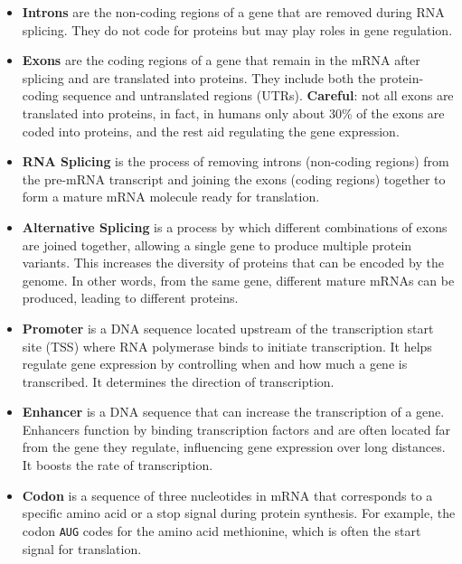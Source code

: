 \documentclass[a4paper]{article}
\begin{document}
\begin{itemize}
  \item \textbf{Introns} are the non-coding regions of a gene that are 
  removed during RNA splicing. They do not code for proteins but may play 
  roles in gene regulation.

  \item \textbf{Exons} are the coding regions of a gene that remain in the 
  mRNA after splicing and are translated into proteins. They include both
  the protein-coding sequence and untranslated regions (UTRs). \textbf{Careful}:
  not all exons are translated into proteins, in fact, in humans only about
  30\% of the exons are coded into proteins, and the rest aid regulating
  the gene expression.
  
  \item \textbf{RNA Splicing} is the process of removing introns (non-coding 
  regions) from the pre-mRNA transcript and joining the exons (coding regions) 
  together to form a mature mRNA molecule ready for translation.
  
  \item \textbf{Alternative Splicing} is a process by which different 
  combinations of exons are joined together, allowing a single gene to produce 
  multiple protein variants. This increases the diversity of proteins that can 
  be encoded by the genome. In other words, from the same gene,
  different mature mRNAs can be produced, leading to different proteins.
  
  \item \textbf{Promoter} is a DNA sequence located upstream of the 
  transcription start site (TSS) where RNA polymerase binds to initiate 
  transcription. It helps regulate gene expression by controlling when and how 
  much a gene is transcribed. It determines the direction of transcription.

  \item \textbf{Enhancer} is a DNA sequence that can increase the transcription 
  of a gene. Enhancers function by binding transcription factors and are often 
  located far from the gene they regulate, influencing gene expression over 
  long distances. It boosts the rate of transcription.

  \item \textbf{Codon} is a sequence of three nucleotides in mRNA that 
  corresponds to a specific amino acid or a stop signal during protein 
  synthesis. For example, the codon \texttt{AUG} codes for the amino acid 
  methionine, which is often the start signal for translation.


\end{itemize}
\end{document}
